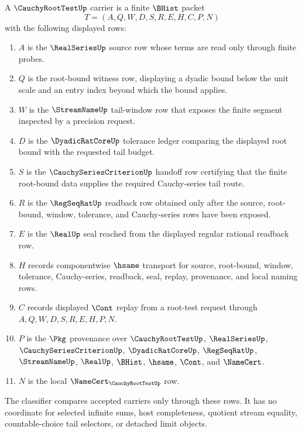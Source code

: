 \begin{definition}
\label{def:cauchy-root-test-carrier}
A $\CauchyRootTestUp$ carrier is a finite $\BHist$ packet
$$
T=(A,Q,W,D,S,R,E,H,C,P,N)
$$
with the following displayed rows:
\begin{enumerate}
\item $A$ is the $\RealSeriesUp$ source row whose terms are read only through finite probes.
\item $Q$ is the root-bound witness row, displaying a dyadic bound below the unit scale and an entry index beyond which the bound applies.
\item $W$ is the $\StreamNameUp$ tail-window row that exposes the finite segment inspected by a precision request.
\item $D$ is the $\DyadicRatCoreUp$ tolerance ledger comparing the displayed root bound with the requested tail budget.
\item $S$ is the $\CauchySeriesCriterionUp$ handoff row certifying that the finite root-bound data supplies the required Cauchy-series tail route.
\item $R$ is the $\RegSeqRatUp$ readback row obtained only after the source, root-bound, window, tolerance, and Cauchy-series rows have been exposed.
\item $E$ is the $\RealUp$ seal reached from the displayed regular rational readback row.
\item $H$ records componentwise $\hsame$ transport for source, root-bound, window, tolerance, Cauchy-series, readback, seal, replay, provenance, and local naming rows.
\item $C$ records displayed $\Cont$ replay from a root-test request through $A,Q,W,D,S,R,E,H,P,N$.
\item $P$ is the $\Pkg$ provenance over $\CauchyRootTestUp$, $\RealSeriesUp$, $\CauchySeriesCriterionUp$, $\DyadicRatCoreUp$, $\RegSeqRatUp$, $\StreamNameUp$, $\RealUp$, $\BHist$, $\hsame$, $\Cont$, and $\NameCert$.
\item $N$ is the local $\NameCert_{\CauchyRootTestUp}$ row.
\end{enumerate}
The classifier compares accepted carriers only through these rows. It has no coordinate for selected infinite sums, host completeness, quotient stream equality, countable-choice tail selectors, or detached limit objects.
\end{definition}


